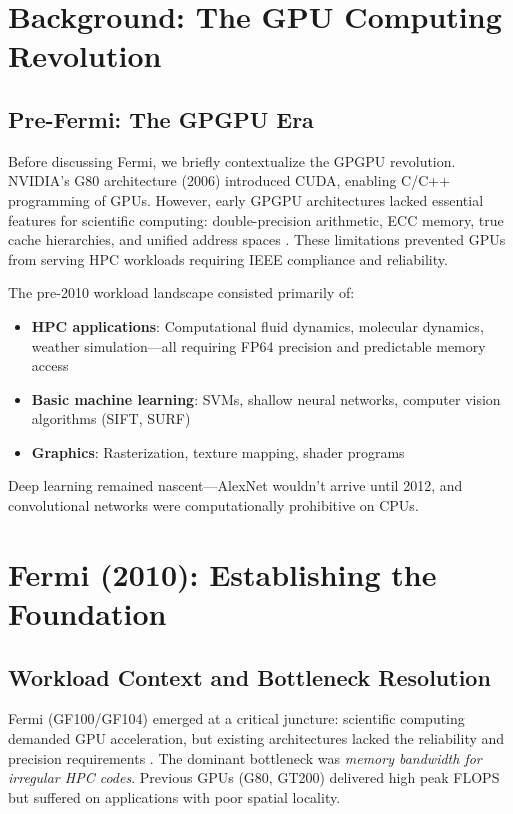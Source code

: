 \documentclass{article}
\begin{document}
\section{Background: The GPU Computing Revolution}

\subsection{Pre-Fermi: The GPGPU Era}

Before discussing Fermi, we briefly contextualize the GPGPU revolution. NVIDIA's G80 architecture (2006) introduced CUDA, enabling C/C++ programming of GPUs. However, early GPGPU architectures lacked essential features for scientific computing: double-precision arithmetic, ECC memory, true cache hierarchies, and unified address spaces \cite{nvidia2009fermi}. These limitations prevented GPUs from serving HPC workloads requiring IEEE compliance and reliability.

The pre-2010 workload landscape consisted primarily of:
\begin{itemize}
\item \textbf{HPC applications}: Computational fluid dynamics, molecular dynamics, weather simulation—all requiring FP64 precision and predictable memory access
\item \textbf{Basic machine learning}: SVMs, shallow neural networks, computer vision algorithms (SIFT, SURF)
\item \textbf{Graphics}: Rasterization, texture mapping, shader programs
\end{itemize}

Deep learning remained nascent—AlexNet wouldn't arrive until 2012, and convolutional networks were computationally prohibitive on CPUs.

\section{Fermi (2010): Establishing the Foundation}

\subsection{Workload Context and Bottleneck Resolution}

Fermi (GF100/GF104) emerged at a critical juncture: scientific computing demanded GPU acceleration, but existing architectures lacked the reliability and precision requirements \cite{nvidia2009fermi}. The dominant bottleneck was \textit{memory bandwidth for irregular HPC codes}. Previous GPUs (G80, GT200) delivered high peak FLOPS but suffered on applications with poor spatial locality.
\end{document}
